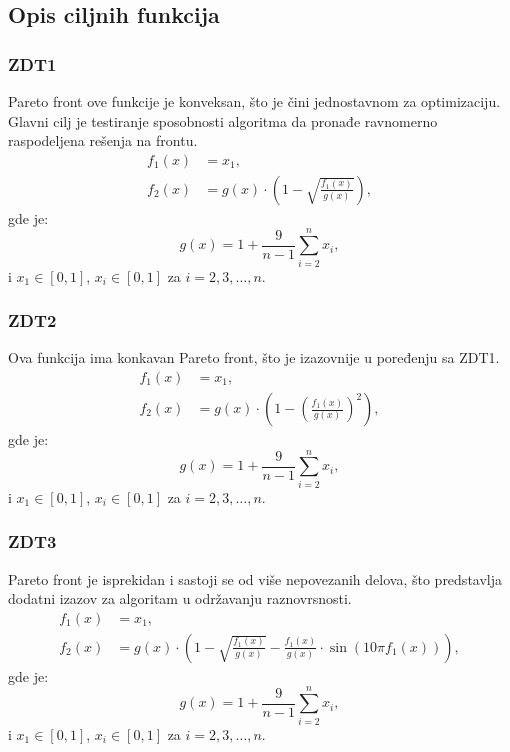 \documentclass[12pt]{article}
\begin{document}
\subsection{Opis ciljnih funkcija}
\subsubsection*{ZDT1}
Pareto front ove funkcije je konveksan, što je čini jednostavnom za optimizaciju. Glavni cilj je testiranje sposobnosti algoritma da pronađe ravnomerno raspodeljena rešenja na frontu.
\[
\begin{aligned}
    f_1(x) &= x_1, \\
    f_2(x) &= g(x) \cdot \left(1 - \sqrt{\frac{f_1(x)}{g(x)}}\right),
\end{aligned}
\]
gde je:
\[
g(x) = 1 + \frac{9}{n-1} \sum_{i=2}^n x_i,
\]
i \( x_1 \in [0, 1] \), \( x_i \in [0, 1] \) za \( i = 2, 3, \dots, n \).
\[\]

\subsubsection*{ZDT2}
Ova funkcija ima konkavan Pareto front, što je izazovnije u poređenju sa ZDT1.
\[
\begin{aligned}
    f_1(x) &= x_1, \\
    f_2(x) &= g(x) \cdot \left(1 - \left(\frac{f_1(x)}{g(x)}\right)^2\right),
\end{aligned}
\]
gde je:
\[
g(x) = 1 + \frac{9}{n-1} \sum_{i=2}^n x_i,
\]
i \( x_1 \in [0, 1] \), \( x_i \in [0, 1] \) za \( i = 2, 3, \dots, n \).

\subsubsection*{ZDT3}
Pareto front je isprekidan i sastoji se od više nepovezanih delova, što predstavlja dodatni izazov za algoritam u održavanju raznovrsnosti.
\[
\begin{aligned}
    f_1(x) &= x_1, \\
    f_2(x) &= g(x) \cdot \left(1 - \sqrt{\frac{f_1(x)}{g(x)}} - \frac{f_1(x)}{g(x)} \cdot \sin(10\pi f_1(x))\right),
\end{aligned}
\]
gde je:
\[
g(x) = 1 + \frac{9}{n-1} \sum_{i=2}^n x_i,
\]
i \( x_1 \in [0, 1] \), \( x_i \in [0, 1] \) za \( i = 2, 3, \dots, n \).
\end{document}
